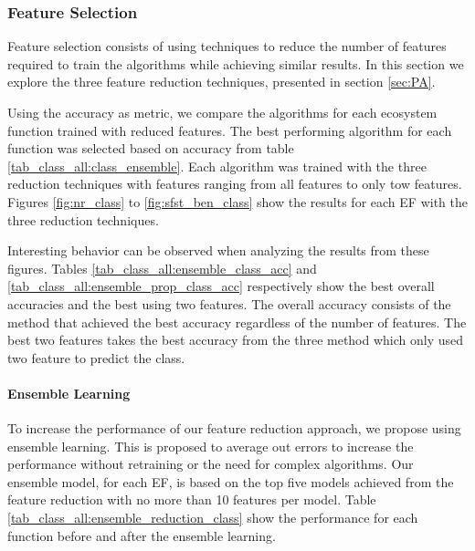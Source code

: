 \documentclass[12pt,letterpaper]{article}
\begin{document}
\subsubsection{Feature Selection}\label{sec:class_all_featred}
Feature selection consists of using techniques to reduce the number of features required to train the algorithms while achieving similar results.
In this section we explore the three feature reduction techniques, presented in section \ref{sec:PA}.

Using the accuracy as metric, we compare the algorithms for each ecosystem function trained with reduced features.
The best performing algorithm for each function was selected based on accuracy from table \ref{tab_class_all:class_ensemble}.
Each algorithm was trained with the three reduction techniques with features ranging from all features to only tow features.
Figures \ref{fig:nr_class} to \ref{fig:sfst_ben_class} show the results for each \ac{EF} with the three reduction techniques.

Interesting behavior can be observed when analyzing the results from these figures.
Tables \ref{tab_class_all:ensemble_class_acc} and \ref{tab_class_all:ensemble_prop_class_acc} respectively show the best overall accuracies and the best using two features.
The overall accuracy consists of the method that achieved the best accuracy regardless of the number of features.
The best two features takes the best accuracy from the three method which only used two feature to predict the class.





\paragraph{Ensemble Learning}
To increase the performance of our feature reduction approach, we propose using ensemble learning.
This is proposed to average out errors to increase the performance without retraining or the need for complex algorithms.
Our ensemble model, for each \ac{EF}, is based on the top five models achieved from the feature reduction with no more than 10 features per model.
Table \ref{tab_class_all:ensemble_reduction_class} show the performance for each function before and after the ensemble learning.
\end{document}
